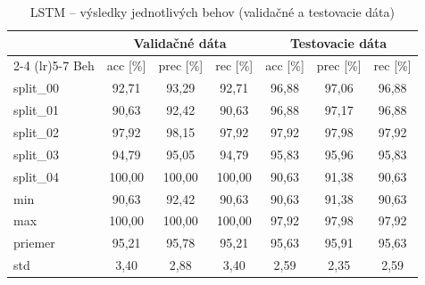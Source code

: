 \begin{table}[H]
    \centering
    \caption{LSTM -- výsledky jednotlivých behov (validačné a testovacie dáta)}
    \label{tab:runs-lstm}
    \footnotesize
    \begin{tabular}{lcccccc}
        \toprule
         & \multicolumn{3}{c}{Validačné dáta} & \multicolumn{3}{c}{Testovacie dáta} \\
        \cmidrule(lr){2-4} \cmidrule(lr){5-7}
        Beh & acc [\%] & prec [\%] & rec [\%] & acc [\%] & prec [\%] & rec [\%] \\
        \midrule
        split\_00 & 92,71 & 93,29 & 92,71 & 96,88 & 97,06 & 96,88 \\
        split\_01 & 90,63 & 92,42 & 90,63 & 96,88 & 97,17 & 96,88 \\
        split\_02 & 97,92 & 98,15 & 97,92 & 97,92 & 97,98 & 97,92 \\
        split\_03 & 94,79 & 95,05 & 94,79 & 95,83 & 95,96 & 95,83 \\
        split\_04 & 100,00 & 100,00 & 100,00 & 90,63 & 91,38 & 90,63 \\
        \midrule
        min & 90,63 & 92,42 & 90,63 & 90,63 & 91,38 & 90,63 \\
        max & 100,00 & 100,00 & 100,00 & 97,92 & 97,98 & 97,92 \\
        priemer & 95,21 & 95,78 & 95,21 & 95,63 & 95,91 & 95,63 \\
        std & 3,40 & 2,88 & 3,40 & 2,59 & 2,35 & 2,59 \\
        \bottomrule
    \end{tabular}
\end{table}
